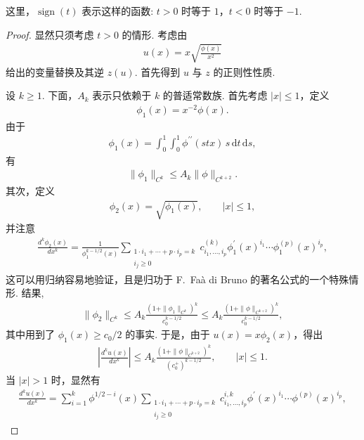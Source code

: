 \begin{lemma}[驻相引理]
这里，$\operatorname{sign}(t)$ 表示这样的函数: $t > 0$ 时等于 $1$，$t < 0$ 时等于 $-1$.
\end{lemma}

\begin{proof}
显然只须考虑 $t > 0$ 的情形. 考虑由
\begin{align*}
  u(x)=x\sqrt{\frac{\phi(x)}{x^{2}}}
\end{align*}
给出的变量替换及其逆 $z(u)$. 首先得到 $u$ 与 $z$ 的正则性性质.

设 $k \geq 1$. 下面，$A_k$ 表示只依赖于 $k$ 的普适常数族. 首先考虑 $|x| \leq 1$，定义
\begin{align*}
  \phi_{1}(x)=x^{-2}\phi(x).
\end{align*}
由于
\begin{align*}
  \phi_{1}(x)=\int_{0}^{1}\int_{0}^{1}\phi^{\prime\prime}(s t x)\,s\,\mathrm{d}t\,\mathrm{d}s,
\end{align*}
有
\begin{align*}
  \|\phi_{1}\|_{C^{k}}\leq A_{k}\|\phi\|_{C^{k+2}}.
\end{align*}
其次，定义
\begin{align*}
  \phi_{2}(x)=\sqrt{\phi_{1}(x)},\qquad |x|\leq 1,
\end{align*}
并注意
\begin{align*}
  \frac{d^{k}\phi_{2}(x)}{d x^{k}}
  =\frac{1}{\phi_{1}^{k-1/2}(x)}\sum_{\substack{1\cdot i_{1}+\cdots+p\cdot i_{p}=k\\ i_{j}\geq 0}}
  c_{i_{1},\ldots,i_{p}}^{(k)}\phi_{1}^{\prime}(x)^{i_{1}}\cdots\phi_{1}^{(p)}(x)^{i_{p}},
\end{align*}
这可以用归纳容易地验证，且是归功于 F.~Faà di Bruno 的著名公式的一个特殊情形. 结果,
\begin{align*}
  \|\phi_{2}\|_{C^{k}}\leq A_{k}\frac{(1+\|\phi_{1}\|_{C^{k}})^{k}}{c_{0}^{k-1/2}}
  \leq A_{k}\frac{(1+\|\phi\|_{C^{k+2}})^{k}}{c_{0}^{k-1/2}},
\end{align*}
其中用到了 $\phi_1(x) \geq c_0/2$ 的事实. 于是，由于 $u(x) = x\phi_2(x)$，得出
\begin{align*}
  \left|\frac{d^{k}u(x)}{d x^{k}}\right|
  \leq A_{k}\frac{(1+\|\phi\|_{C^{k+2}})^{k}}{(c_{0}^{+})^{k-1/2}},\qquad |x|\leq 1.
\end{align*}
当 $|x| > 1$ 时，显然有
\begin{align*}
  \frac{d^{k}u(x)}{d x^{k}}
  =\sum_{i=1}^{k}\phi^{1/2-i}(x)\sum_{\substack{1\cdot i_{1}+\cdots+p\cdot i_{p}=k\\ i_{j}\geq 0}}
  c_{i_{1},\ldots,i_{p}}^{i,k}\phi^{\prime}(x)^{i_{1}}\cdots\phi^{(p)}(x)^{i_{p}},

\end{align*}
\end{proof}
